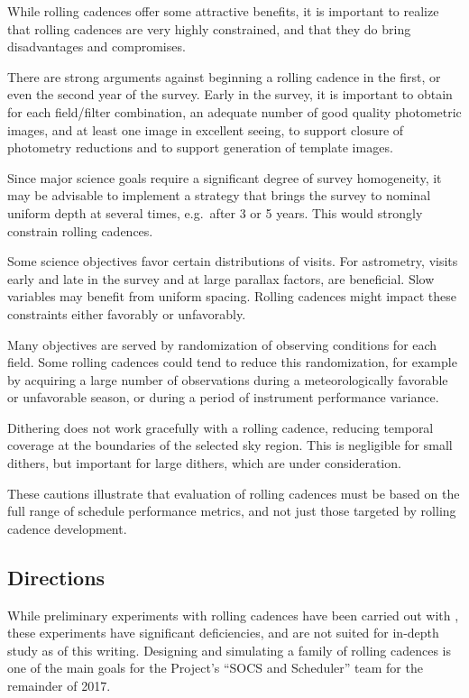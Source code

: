 While rolling cadences offer some attractive benefits, it is important
to realize that rolling cadences are very highly constrained, and that
they do bring disadvantages and compromises.

There are strong arguments against beginning a rolling cadence in the
first, or even the second year of the survey.  Early in the survey, it
is important to obtain for each field/filter combination, an adequate
number of good quality photometric images, and at least one image in
excellent seeing, to support closure of photometry reductions and to
support generation of template images.

Since major science goals require a significant degree of survey
homogeneity, it may be advisable to implement a strategy that brings the
survey to nominal uniform depth at several times, e.g.\ after 3 or 5
years.  This would strongly constrain rolling cadences.

Some science objectives favor certain distributions of visits.  For
astrometry, visits early and late in the survey and at large parallax
factors, are beneficial.  Slow variables may benefit from uniform
spacing.  Rolling cadences might impact these constraints either
favorably or unfavorably.

Many objectives are served by randomization of observing conditions for
each field.  Some rolling cadences could tend to reduce this
randomization, for example by acquiring a large number of observations
during a meteorologically favorable or unfavorable season, or during a
period of instrument performance variance.

Dithering does not work gracefully with a rolling cadence, reducing
temporal coverage at the boundaries of the selected sky region.  This is
negligible for small dithers, but important for large dithers, which are
under consideration.

These cautions illustrate that evaluation of rolling cadences must be
based on the full range of schedule performance metrics, and not just
those targeted by rolling cadence development.



\subsection{Directions}
\label{sec:rolling:directions}

While preliminary experiments with rolling cadences have been carried
out with \OpSim, these experiments have significant deficiencies, and
are not suited for in-depth study as of this writing. Designing and 
simulating a family of rolling cadences is one of the main goals for the 
Project's ``SOCS and Scheduler'' team for the remainder of 2017. 

